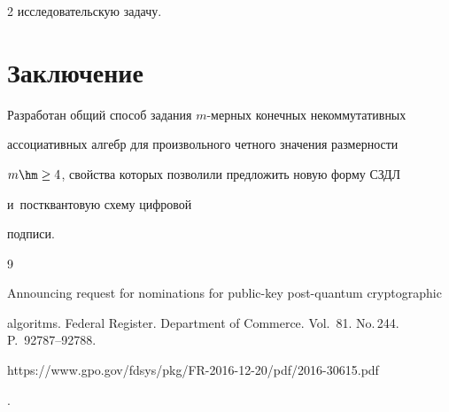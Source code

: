 \begin{multicols}{2}
исследовательскую задачу. 





  \vspace*{-9pt}


  


\section{Заключение}





\vspace*{-2pt}





  Разработан общий способ задания $m$-мер\-ных конечных некоммутативных 


ассоциативных алгебр для произвольного четного значения размерности 


$m\hm\geq4$, свойства которых позволили предложить новую форму СЗДЛ


 и~постквантовую схему цифровой 


подписи. 





  \vspace*{-9pt}


  


{\small\frenchspacing


 {%




 \begin{thebibliography}{9}


 


 \vspace*{-2pt}


 




Announcing request for nominations for public-key post-quantum cryptographic 


algoritms. Federal Register. Department of Commerce.  Vol.~81. No.\,244. P.~92787--92788.


{\sf  


https://www.gpo.gov/fdsys/pkg/FR-2016-12-20/pdf/2016-30615.pdf}.



\end{thebibliography}}}
\end{multicols}
